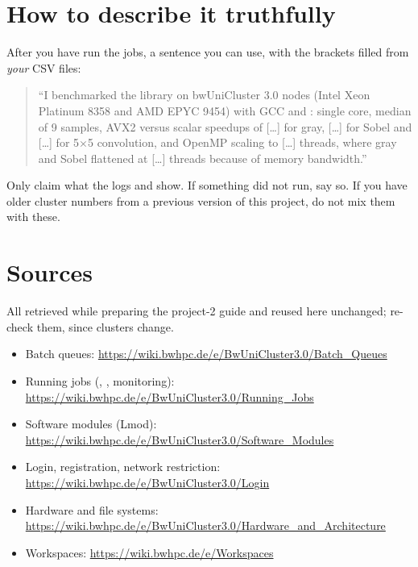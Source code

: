 \section{How to describe it truthfully}

After you have run the jobs, a sentence you can use, with the brackets filled from \emph{your} CSV files:
\begin{quote}
``I benchmarked the library on bwUniCluster 3.0 nodes (Intel Xeon Platinum 8358 and AMD EPYC 9454) with GCC and : single core, median of 9 samples, AVX2 versus scalar speedups of [\dots] for gray, [\dots] for Sobel and [\dots] for 5$\times$5 convolution, and OpenMP scaling to [\dots] threads, where gray and Sobel flattened at [\dots] threads because of memory bandwidth.''
\end{quote}
Only claim what the logs and  show. If something did not run, say so. If you have older cluster numbers from a previous version of this project, do not mix them with these.

\section{Sources}

All retrieved while preparing the project-2 guide and reused here unchanged; re-check them, since clusters change.
\begin{itemize}\small
\item Batch queues: \url{https://wiki.bwhpc.de/e/BwUniCluster3.0/Batch_Queues}
\item Running jobs (, , monitoring): \url{https://wiki.bwhpc.de/e/BwUniCluster3.0/Running_Jobs}
\item Software modules (Lmod): \url{https://wiki.bwhpc.de/e/BwUniCluster3.0/Software_Modules}
\item Login, registration, network restriction: \url{https://wiki.bwhpc.de/e/BwUniCluster3.0/Login}
\item Hardware and file systems: {\small\url{https://wiki.bwhpc.de/e/BwUniCluster3.0/Hardware_and_Architecture}}
\item Workspaces: \url{https://wiki.bwhpc.de/e/Workspaces}
\end{itemize}
